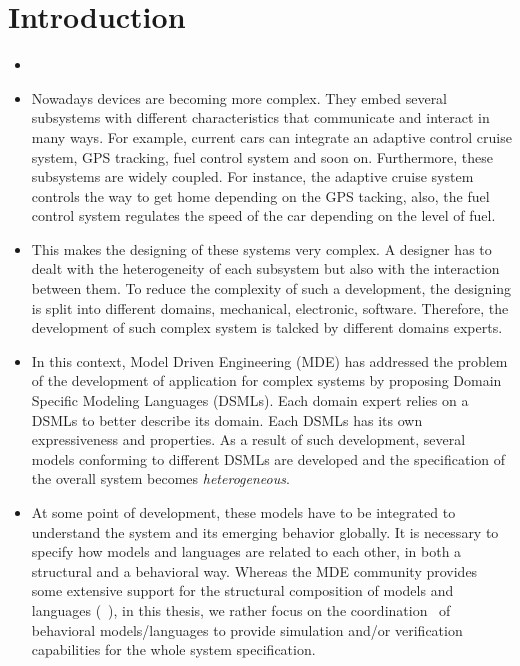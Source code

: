 \chapter{Introduction}


\begin{itemize}
	
	\item {}
	\item Nowadays devices are becoming more complex. They embed several subsystems with different characteristics that communicate and interact in many ways. For example, current cars can integrate an adaptive control cruise system, GPS tracking, fuel control system and soon on. Furthermore, these subsystems are widely coupled. For instance, the adaptive cruise system controls the way to get home depending on the GPS tacking, also, the fuel control system regulates the speed of the car depending on the level of fuel.
	
	\item This makes the designing of these systems very complex. A designer has to dealt with the heterogeneity of each subsystem but also with the interaction between them. To reduce the complexity of such a development, the designing is split into different domains, \eg mechanical, electronic, software. Therefore, the development of such complex system is talcked by different domains experts.
	
	\item In this context, Model Driven Engineering (MDE) has addressed the problem of the development of application for complex systems by proposing Domain Specific Modeling Languages (DSMLs). Each domain expert relies on a DSMLs to better describe its domain. Each DSMLs has its own expressiveness and properties. As a result of such development, several models conforming to different DSMLs are developed and the specification of the overall system becomes \emph{heterogeneous}.
	\item At some point of development, these models have to be integrated to understand the system and its emerging behavior globally. It is necessary to specify how models and languages are related to each other, in both a structural and a behavioral way. Whereas the MDE community provides some extensive support for the structural composition of models and languages (\eg~\cite{kompose,epsilon}), in this thesis, we rather focus on the coordination~\cite{coordsignibib} of behavioral models/languages to provide simulation and/or verification capabilities for the whole system specification. 
	

\end{itemize}
